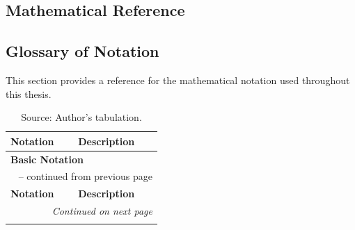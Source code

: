 \begin{appendices}

  \chapter{Mathematical Reference}
  \label{app:math_reference}

  \section{Glossary of Notation}
  \label{app:math_notation}

  This section provides a reference for the mathematical notation used throughout this thesis. 

  \begingroup
  \begin{longtable}{p{}p{}}
    \caption[Summary of Mathematical Notation]{Mathematical Notation} \label{tab:math_notation}                                        \\
    \toprule
    \textbf{Notation}                           & \textbf{Description}                                                                 \\
    \midrule
    \multicolumn{2}{l}{\textbf{Basic Notation}}                                                                                        \\
    \midrule
    \endfirsthead
    \multicolumn{2}{c}{\tablename\ \thetable{} -- continued from previous page}                                                        \\
    \toprule
    \textbf{Notation}                           & \textbf{Description}                                                                 \\
    \midrule
    \endhead
    \midrule
    \multicolumn{2}{r}{\textit{Continued on next page}}                                                                                \\
    \endfoot
    \bottomrule
    \caption*{Source: Author's tabulation.}
    \endlastfoot


\end{longtable}
\end{appendices}
